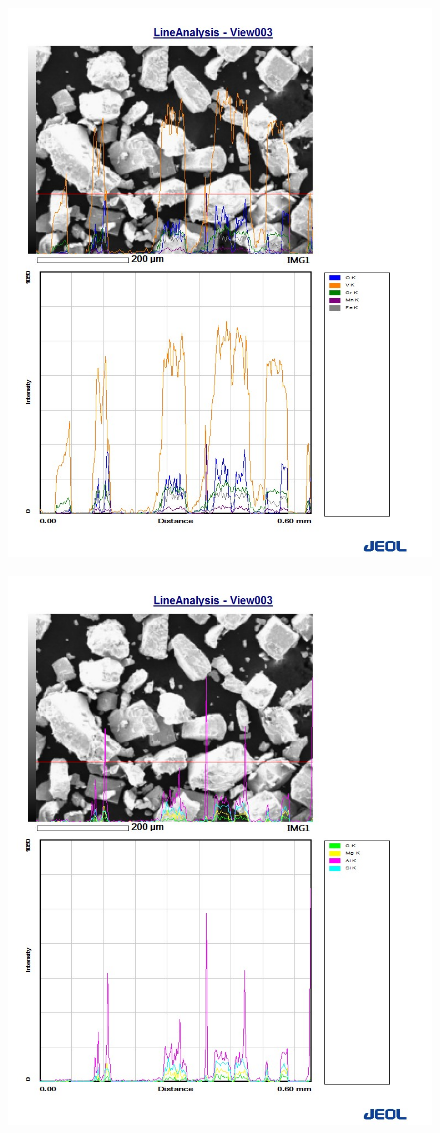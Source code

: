 \documentclass[14pt]{extarticle}
\begin{document}
\begin{figure}[H]
	\includegraphics[width = 0.9\linewidth]{./pictures/line_spec_1.jpg}
\end{figure}
\begin{figure}[H]
	\includegraphics[width = 0.9\linewidth]{./pictures/line_spec_2.jpg}
\end{figure}
\end{document}
